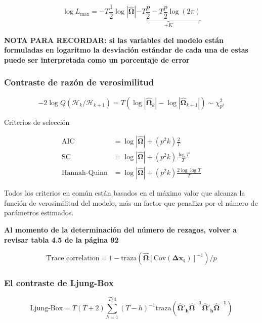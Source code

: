 \documentclass[12pt, twoside]{book}\usepackage[]{graphicx}\usepackage[]{color}
\numberwithin{equation}{section}
\numberwithin{theorem}{section}
\numberwithin{teorema}{section}
\numberwithin{defi}{section}
\numberwithin{prop}{section}
\numberwithin{defi}{section}
\theoremstyle{plain}
\begin{document}
\begin{equation}
\log L_{\max} = -T \frac{1}{2} \log |\boldsymbol{\hat{\Omega}}|\underbrace{-T\frac{p}{2}-T\frac{p}{2}\log(2\pi)}_{+K}
\end{equation}

\textbf{NOTA PARA RECORDAR: si las variables del modelo están formuladas en logaritmo la desviación estándar de cada una de estas puede ser interpretada como un porcentaje de error }


\subsubsection{Contraste de razón de verosimilitud}

\begin{equation}
  -2\log Q(\mathcal{H}_{k}/\mathcal{H}_{k+1}) =  T(\log|\boldsymbol{\hat{\Omega}}_{k}|-\log|\boldsymbol{\hat{\Omega}}_{k+1}|) \sim \chi^{2}_{p^{2}}
\end{equation}


Criterios de selección 

\begin{align}
\text{AIC} & = \log |\boldsymbol{\hat{\Omega}}|+(p^{2}k)\frac{2}{T} \\ 
\text{SC} & = \log|\boldsymbol{\hat{\Omega}}|+(p^{2}k)\frac{\log T}{T} \\ 
\text{Hannah-Quinn} & = \log|\boldsymbol{\hat{\Omega}}|+(p^{2}k)\frac{2\log \log T}{T}
\end{align}

Todos los criterios en común están basados en el máximo valor que alcanza la función de verosimilitud del modelo, más un factor que penaliza por el número de parámetros estimados. 

\textbf{
Al momento de la determinación del número de rezagos, volver a revisar tabla 4.5 de la página 92}

\begin{equation}
\text{Trace correlation} = 1-\text{traza}(\boldsymbol{\hat{\Omega}}[\text{Cov}(\mathbf{\Delta x_{t}})]^{-1})/p 
\end{equation}


\subsubsection{El contraste de Ljung-Box}

\begin{equation}
\text{Ljung-Box} = T(T+2)\sum_{h=1}^{T/4}(T-h)^{-1}\text{traza}(\boldsymbol{\hat{\Omega}'_{h}\hat{\Omega}^{-1}\hat{\Omega}'_{h}\hat{\Omega}^{-1}})
\end{equation}
\end{document}
